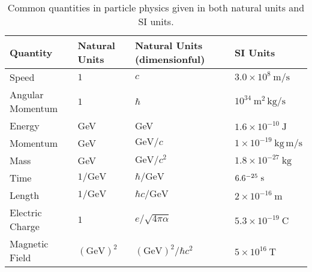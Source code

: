 \begin{table}[htpb]
 \centering
 \caption{Common quantities in particle physics given in both natural units and SI units.}
 \begin{tabular}{@{}llll@{}} \toprule
  Quantity         & Natural Units                 & Natural Units (dimensionful)            & SI Units                                              \\ \midrule
  Speed            & $1$                           & $c$                                     & $3.0\times 10^{8}~\textrm{m}/\textrm{s}$              \\
  Angular Momentum & $1$                           & $\hbar$                                 & $10^{34}~\textrm{m}^2 \,\textrm{kg}/\textrm{s}$       \\
  Energy           & \textrm{GeV}                  & \textrm{GeV}                            & $1.6\times 10^{-10}~\textrm{J}$                       \\
  Momentum         & \textrm{GeV}                  & $\textrm{GeV}/c$                        & $1\times 10^{-19}~\textrm{kg}\,\textrm{m}/\textrm{s}$ \\
  Mass             & \textrm{GeV}                  & $\textrm{GeV}/c^2$                      & $1.8\times 10^{-27}~\textrm{kg}$                      \\
  Time             & $1/\textrm{GeV}$              & $\hbar/\textrm{GeV}$                    & $6.6\time 10^{-25}~\textrm{s}$                        \\
  Length           & $1/\textrm{GeV}$              & $\hbar c/\textrm{GeV}$                  & $2\times 10^{-16}~\textrm{m}$                         \\
  Electric Charge  & $1$                           & $e/\sqrt{4\pi \alpha}$                  & $5.3\times 10^{-19}~\textrm{C}$                       \\
  Magnetic Field   & $\left(\textrm{GeV}\right)^2$ & $\left(\textrm{GeV}\right)^2/\hbar c^2$ & $5\times 10^{16}~\textrm{T}$                          \\
  \bottomrule
 \end{tabular}\label{table:natural_units}%
\end{table}


